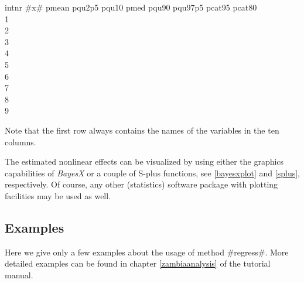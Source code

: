 \footnotesize
intnr  \quad #x# \quad  pmean \quad pqu2p5 \quad pqu10 \quad pmed \quad pqu90 \quad pqu97p5 \quad pcat95 \quad   pcat80 \\
1           \\
2                 \\
3              \\
4               \\
5                \\
6              \\
7                  \\
8             \\
9                

\normalsize

Note that the first row always contains the names of the variables
in the ten columns.

The estimated nonlinear effects can be visualized by using either
the graphics capabilities of {\em BayesX} or a couple of S-plus
functions, see \autoref{bayesxplot} and \autoref{splus},
respectively. Of course, any other (statistics) software package
with plotting facilities may be used as well.

\subsection{Examples}

Here we give only a few examples about the usage of method
#regress#. More detailed examples can be found in chapter
\ref{zambiaanalysis} of the tutorial manual.

